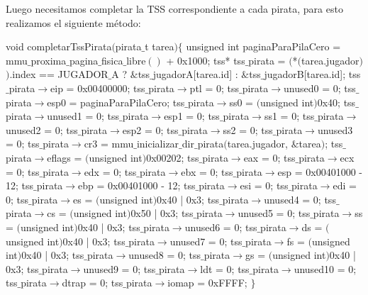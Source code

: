 Luego necesitamos completar la TSS correspondiente a cada pirata, para esto realizamos el siguiente m\'etodo:

\begin{algorithmic}
\State \tab void completarTssPirata$($pirata$\_$t tarea$) \{$
  \State \tab \tab unsigned int paginaParaPilaCero = mmu$\_$proxima$\_$pagina$\_$fisica$\_$libre$()$ + 0x1000;
\State \tab \tab
  \State \tab \tab tss* tss$\_$pirata = $($*$($tarea.jugador$)$$)$.index == JUGADOR$\_$A ? $\&$tss$\_$jugadorA[tarea.id] : $\&$tss$\_$jugadorB[tarea.id];
\State \tab \tab
  \State \tab \tab tss$\_$pirata$\to$eip = 0x00400000;
  \State \tab \tab tss$\_$pirata$\to$ptl = 0;
  \State \tab \tab tss$\_$pirata$\to$unused0 = 0;
  \State \tab \tab tss$\_$pirata$\to$esp0 = paginaParaPilaCero;
  \State \tab \tab tss$\_$pirata$\to$ss0 = $($unsigned int$)$0x40;
  \State \tab \tab tss$\_$pirata$\to$unused1 = 0;
  \State \tab \tab tss$\_$pirata$\to$esp1 = 0;
  \State \tab \tab tss$\_$pirata$\to$ss1 = 0;
  \State \tab \tab tss$\_$pirata$\to$unused2 = 0;
  \State \tab \tab tss$\_$pirata$\to$esp2 = 0;
  \State \tab \tab tss$\_$pirata$\to$ss2 = 0;
  \State \tab \tab tss$\_$pirata$\to$unused3 = 0;
  \State \tab \tab tss$\_$pirata$\to$cr3 = mmu$\_$inicializar$\_$dir$\_$pirata$($tarea.jugador, $\&$tarea$)$;
  \State \tab \tab tss$\_$pirata$\to$eflags = $($unsigned int$)$0x00202;
  \State \tab \tab tss$\_$pirata$\to$eax = 0;
  \State \tab \tab tss$\_$pirata$\to$ecx = 0;
  \State \tab \tab tss$\_$pirata$\to$edx = 0;
  \State \tab \tab tss$\_$pirata$\to$ebx = 0;
  \State \tab \tab tss$\_$pirata$\to$esp = 0x00401000 - 12;
  \State \tab \tab tss$\_$pirata$\to$ebp = 0x00401000 - 12;
  \State \tab \tab tss$\_$pirata$\to$esi = 0;
  \State \tab \tab tss$\_$pirata$\to$edi = 0;
  \State \tab \tab tss$\_$pirata$\to$es = $($unsigned int$)$0x40 | 0x3;
  \State \tab \tab tss$\_$pirata$\to$unused4 = 0;
  \State \tab \tab tss$\_$pirata$\to$cs = $($unsigned int$)$0x50 | 0x3;
  \State \tab \tab tss$\_$pirata$\to$unused5 = 0;
  \State \tab \tab tss$\_$pirata$\to$ss = $($unsigned int$)$0x40 | 0x3;
  \State \tab \tab tss$\_$pirata$\to$unused6 = 0;
  \State \tab \tab tss$\_$pirata$\to$ds = $($unsigned int$)$0x40 | 0x3;
  \State \tab \tab tss$\_$pirata$\to$unused7 = 0;
  \State \tab \tab tss$\_$pirata$\to$fs = $($unsigned int$)$0x40 | 0x3;
  \State \tab \tab tss$\_$pirata$\to$unused8 = 0;
  \State \tab \tab tss$\_$pirata$\to$gs = $($unsigned int$)$0x40 | 0x3;
  \State \tab \tab tss$\_$pirata$\to$unused9 = 0;
  \State \tab \tab tss$\_$pirata$\to$ldt = 0;
  \State \tab \tab tss$\_$pirata$\to$unused10 = 0;
  \State \tab \tab tss$\_$pirata$\to$dtrap = 0;
  \State \tab \tab tss$\_$pirata$\to$iomap = 0xFFFF;
\State \tab $\}$
\end{algorithmic}

